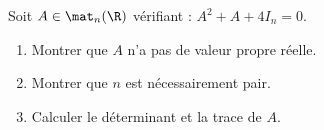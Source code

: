 \begin{enonce}
\begin{exercise}[ID={RMS 121-2 E1073 Autres écoles PSI},subtitle={},tags={}]
  Soit $A\in\mat_n(\R)$ vérifiant : $A^2+A+4I_n=0$.
  \begin{enumerate}
    \item Montrer que $A$ n'a pas de valeur propre réelle.
    \item Montrer que $n$ est nécessairement pair.
    \item Calculer le déterminant et la trace de $A$.
  \end{enumerate}
\end{exercise}
\begin{solution}
\end{solution}
\end{enonce}
